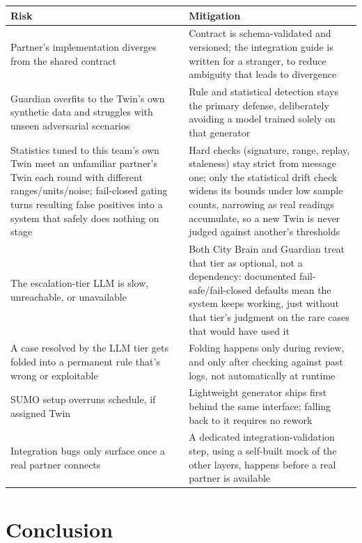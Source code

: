 \documentclass[10pt,letterpaper]{article}
\begin{document}
\begin{longtable}{p{2.6in} p{3.4in}}
\toprule
\textbf{Risk} & \textbf{Mitigation} \\
\midrule
\endhead
Partner's implementation diverges from the shared contract & Contract is schema-validated and versioned; the integration guide is written for a stranger, to reduce ambiguity that leads to divergence \\
Guardian overfits to the Twin's own synthetic data and struggles with unseen adversarial scenarios & Rule and statistical detection stays the primary defense, deliberately avoiding a model trained solely on that generator \\
Statistics tuned to this team's own Twin meet an unfamiliar partner's Twin each round with different ranges/units/noise; fail-closed gating turns resulting false positives into a system that safely does nothing on stage & Hard checks (signature, range, replay, staleness) stay strict from message one; only the statistical drift check widens its bounds under low sample counts, narrowing as real readings accumulate, so a new Twin is never judged against another's thresholds \\
The escalation-tier LLM is slow, unreachable, or unavailable & Both City Brain and Guardian treat that tier as optional, not a dependency: documented fail-safe/fail-closed defaults mean the system keeps working, just without that tier's judgment on the rare cases that would have used it \\
A case resolved by the LLM tier gets folded into a permanent rule that's wrong or exploitable & Folding happens only during review, and only after checking against past logs, not automatically at runtime \\
SUMO setup overruns schedule, if assigned Twin & Lightweight generator ships first behind the same interface; falling back to it requires no rework \\
Integration bugs only surface once a real partner connects & A dedicated integration-validation step, using a self-built mock of the other layers, happens before a real partner is available \\
\bottomrule
\end{longtable}

\section{Conclusion}
\end{document}
